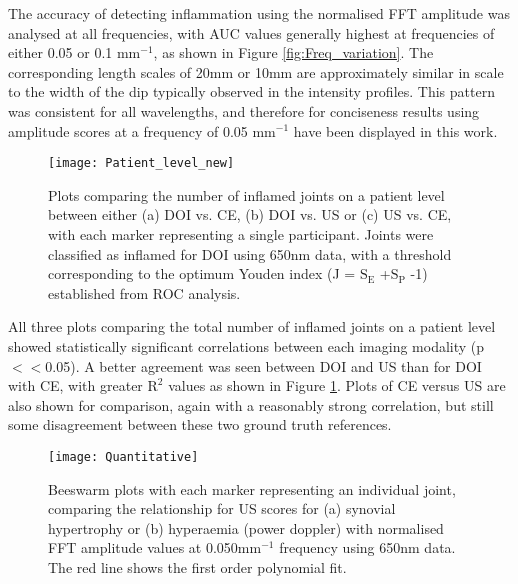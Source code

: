 \documentclass[twoside]{bhamthesis}
\theoremstyle{definition}
\begin{document}
The accuracy of detecting inflammation using the normalised FFT amplitude was analysed at all frequencies, with AUC values generally highest at frequencies of either 0.05 or 0.1 mm$^{-1}$, as shown in Figure \ref{fig:Freq_variation}. The corresponding length scales of 20mm or 10mm are approximately similar in scale to the width of the dip typically observed in the intensity profiles. This pattern was consistent for all wavelengths, and therefore for conciseness results using amplitude scores at a frequency of 0.05 mm$^{-1}$ have been displayed in this work.

\begin{figure}[!ht]
\centering\texttt{[image: Patient\_level\_new]}
\caption{Plots comparing the number of inflamed joints on a patient level between either (a) DOI vs. CE, (b) DOI vs. US or  (c) US vs. CE, with each marker representing a single participant. Joints were classified as inflamed for DOI using 650nm data, with a threshold corresponding to the optimum Youden index (J = $\mathrm{S_E}$ +$\mathrm{S_P}$ -1) established from ROC analysis.}
\label{fig:Patient_level}
\end{figure}

All three plots comparing the total number of inflamed joints on a patient level showed statistically significant correlations between each imaging modality (p$<<$0.05). A better agreement was seen between DOI and US than for DOI with CE, with greater $\mathrm{R^2}$ values as shown in Figure \ref{fig:Patient_level}. Plots of CE versus US are also shown for comparison, again with a reasonably strong correlation, but still some disagreement between these two ground truth references.

\begin{figure}[!ht]
\centering\texttt{[image: Quantitative]}
\caption{Beeswarm plots with each marker representing an individual joint, comparing the relationship for US scores for (a) synovial hypertrophy or (b) hyperaemia (power doppler) with normalised FFT amplitude values at 0.050mm$^{-1}$ frequency using 650nm data. The red line shows the first order polynomial fit.}
\label{fig:Quantitative}
\end{figure}
 
\end{document}
